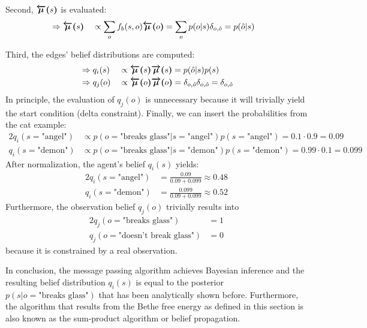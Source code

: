 Second, \(\textcolor{black}{\bm{\overleftarrow{\mu}(}s\bm{)}}\) is evaluated:
\begin{alignat}{2}
     & \Rightarrow \textcolor{black}{\bm{\overleftarrow{\mu}(}s\bm{)}} &  & \propto \sum_o f_b(s,o) \textcolor{black}{\bm{\overleftarrow{\mu}(}o\bm{)}} = \sum_o p(o|s) \delta_{o,\hat o} = p(\hat o|s)
\end{alignat}

Third, the edges' belief distributions are computed:
\begin{alignat}{2}
     & \Rightarrow q_i(s) &  & \propto \textcolor{black}{\bm{\overleftarrow{\mu}(}s\bm{)}} \textcolor{black}{\bm{\overrightarrow{\mu}(}s\bm{)}} = p(\hat o|s) p(s)                                        \\
     & \Rightarrow q_j(o) &  & \propto \textcolor{black}{\bm{\overleftarrow{\mu}(}o\bm{)}} \textcolor{black}{\bm{\overrightarrow{\mu}(}o\bm{)}} = \delta_{o,\hat o} \delta_{o,\hat o} = \delta_{o,\hat o}
\end{alignat}
In principle, the evaluation of \(q_j(o)\) is unnecessary because it will trivially yield the start condition (delta constraint).
Finally, we can insert the probabilities from the cat example:
\begin{alignat}{2}
    q_i(s=\text{"angel"}) & \propto p(o=\text{"breaks glass"}|s=\text{"angel"}) p(s=\text{"angel"}) = 0.1 \cdot 0.9 = 0.09   \\
    q_i(s=\text{"demon"}) & \propto p(o=\text{"breaks glass"}|s=\text{"demon"}) p(s=\text{"demon"}) = 0.99 \cdot 0.1 = 0.099
\end{alignat}
After normalization, the agent's belief \(q_i(s)\) yields:
\begin{alignat}{2}
    q_i(s=\text{"angel"}) & = \frac{0.09}{0.09+0.099} \approx 0.48  \\
    q_i(s=\text{"demon"}) & = \frac{0.099}{0.09+0.099} \approx 0.52
\end{alignat}
Furthermore, the observation belief \(q_j(o)\) trivially results into
\begin{alignat}{2}
    q_j(o=\text{"breaks glass"})        & = 1  \\
    q_j(o=\text{"doesn't break glass"}) & = 0
\end{alignat}
because it is constrained by a real observation.

In conclusion, the message passing algorithm achieves Bayesian inference and the resulting belief distribution \(q_i(s)\) is equal to the posterior \(p(s|o=\text{"breaks glass"})\) that has been analytically shown before. Furthermore, the algorithm that results from the Bethe free energy as defined in this section is also known as the sum-product algorithm or belief propagation.


